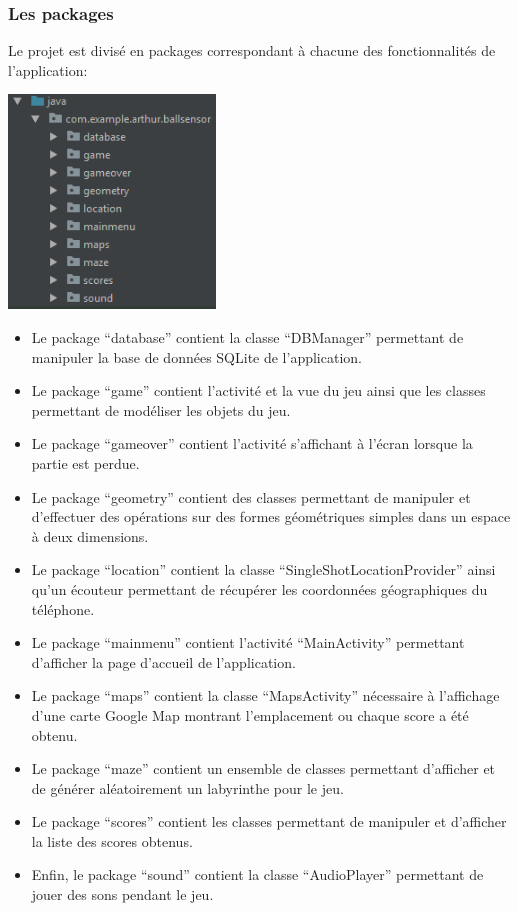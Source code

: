 \documentclass{article}
\begin{document}
\subsubsection{Les packages}
Le projet est divisé en packages correspondant à chacune des fonctionnalités de l'application:
\begin{center}
  \includegraphics[width=5.5cm]{packages.png}
\end{center}
\begin{itemize}
  \item Le package \enquote{database} contient la classe \enquote{DBManager} permettant de manipuler la base de données SQLite de l'application.
  \item Le package \enquote{game} contient l'activité et la vue du jeu ainsi que les classes permettant de modéliser les objets du jeu.
  \item Le package \enquote{gameover} contient l'activité s'affichant à l'écran lorsque la partie est perdue.
  \item Le package \enquote{geometry} contient des classes permettant de manipuler et d'effectuer des opérations sur des formes géométriques simples dans un espace à deux dimensions.
  \item Le package \enquote{location} contient la classe \enquote{SingleShotLocationProvider} ainsi qu'un écouteur permettant de récupérer les coordonnées géographiques du téléphone.
  \item Le package \enquote{mainmenu} contient l'activité \enquote{MainActivity} permettant d'afficher la page d'accueil de l'application.
  \item Le package \enquote{maps} contient la classe \enquote{MapsActivity} nécessaire à l'affichage d'une carte Google Map montrant l'emplacement ou chaque score a été obtenu.
  \item Le package \enquote{maze} contient un ensemble de classes permettant d'afficher et de générer aléatoirement un labyrinthe pour le jeu.
  \item Le package \enquote{scores} contient les classes permettant de manipuler et d'afficher la liste des scores obtenus.
  \item Enfin, le package \enquote{sound} contient la classe \enquote{AudioPlayer} permettant de jouer des sons pendant le jeu.
\end{itemize}
\end{document}
